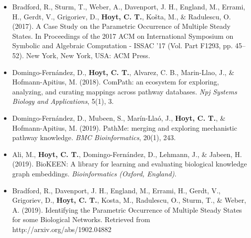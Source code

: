 \begin{itemize}
    \item Bradford, R., Sturm, T., Weber, A., Davenport, J. H., England, M., Errami, H., Gerdt, V., Grigoriev, D., \textbf{Hoyt, C. T.}, Košta, M., \& Radulescu, O. (2017). A Case Study on the Parametric Occurrence of Multiple Steady States. In Proceedings of the 2017 ACM on International Symposium on Symbolic and Algebraic Computation - ISSAC ’17 (Vol. Part F1293, pp. 45–52). New York, New York, USA: ACM Press.
    \item Domingo-Fernández, D., \textbf{Hoyt, C. T.}, Alvarez, C. B., Marin-Llao, J., \& Hofmann-Apitius, M. (2018). ComPath: an ecosystem for exploring, analyzing, and curating mappings across pathway databases. \textit{Npj Systems Biology and Applications}, 5(1), 3.
    \item Domingo-Fernández, D., Mubeen, S., Marín-Llaó, J., \textbf{Hoyt, C. T.}, \& Hofmann-Apitius, M. (2019). PathMe: merging and exploring mechanistic pathway knowledge. \textit{BMC Bioinformatics}, 20(1), 243.
    \item Ali, M., \textbf{Hoyt, C. T.}, Domingo-Fernández, D., Lehmann, J., \& Jabeen, H. (2019). BioKEEN: A library for learning and evaluating biological knowledge graph embeddings. \textit{Bioinformatics (Oxford, England)}.
    \item Bradford, R., Davenport, J. H., England, M., Errami, H., Gerdt, V., Grigoriev, D., \textbf{Hoyt, C. T.}, Kosta, M., Radulescu, O., Sturm, T., \& Weber, A. (2019). Identifying the Parametric Occurrence of Multiple Steady States for some Biological Networks. Retrieved from http://arxiv.org/abs/1902.04882
\end{itemize}

\tableofcontents
